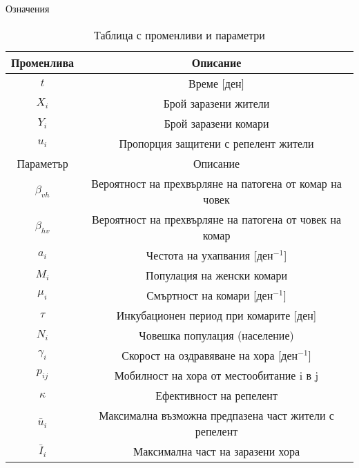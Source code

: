\begin{frame}[t]{Означения}
  \vspace{-1em}
  \begin{table}
    \begin{small}
      \begin{table}[h]
        \centering
        \begin{tabular}{ |c||c| }
          \hline
          Променлива & Описание\\
          \hline
          $t$ & Време [$\text{ден}$]\\
          $X_i$ & Брой заразени жители\\
          $Y_i$ & Брой заразени комари \\
          $u_i$ & Пропорция защитени с репелент жители \\
          \hline
          \hline
          Параметър & Описание\\
          \hline
          $\beta_{vh}$ & Вероятност на прехвърляне на патогена от комар на човек \\
          $\beta_{hv}$ & Вероятност на прехвърляне на патогена от човек на комар \\
          $a_i$ & Честота на ухапвания [$\text{ден}^{-1}$]\\
          $M_i$ & Популация на женски комари\\
          $\mu_i$ & Смъртност на комари [$\text{ден}^{-1}$]\\
          $\tau$ & Инкубационен период при комарите [$\text{ден}$]\\
          $N_i$ & Човешка популация (население) \\
          $\gamma_i$ & Скорост на оздравяване на хора [$\text{ден}^{-1}$]\\
          $p_{ij}$ & Мобилност на хора от местообитание i в j\\
          $\kappa$ & Ефективност на репелент\\
          $\bar{u}_i$ & Максимална възможна предпазена част жители с репелент\\
          $\bar{I}_i$ & Максимална част на заразени хора\\
          \hline
        \end{tabular}
      \end{table}
    \end{small}
    \caption{Таблица с променливи и параметри}
    \label{tbl:Definitions}
  \end{table}
\end{frame}

